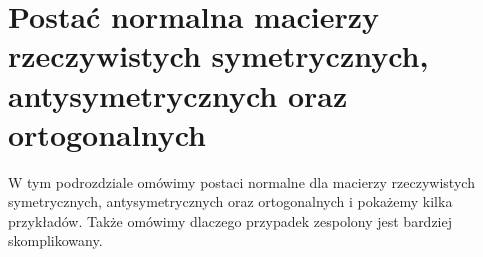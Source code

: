 \section{Postać normalna macierzy rzeczywistych symetrycznych, antysymetrycznych oraz ortogonalnych}

W tym podrozdziale omówimy postaci normalne dla macierzy rzeczywistych symetrycznych, antysymetrycznych oraz ortogonalnych i pokażemy kilka przykładów. Także omówimy dlaczego przypadek zespolony jest bardziej skomplikowany.





